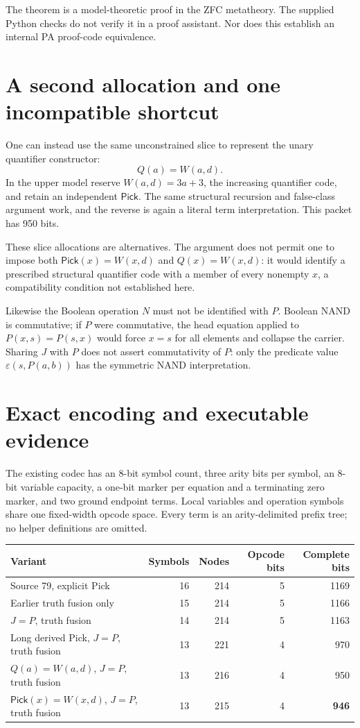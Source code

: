 \documentclass[11pt]{article}
\newcommand{\eps}{\varepsilon}
\begin{document}
The theorem is a model-theoretic proof in the ZFC metatheory. The supplied
Python checks do not verify it in a proof assistant. Nor does this establish
an internal PA proof-code equivalence.

\section{A second allocation and one incompatible shortcut}

One can instead use the same unconstrained slice to represent the unary
quantifier constructor:
\[
                  Q(a)=W(a,d).
\]
In the upper model reserve $W(a,d)=3a+3$, the increasing quantifier code,
and retain an independent $\mathsf{Pick}$. The same structural recursion
and false-class argument work, and the reverse is again a literal term
interpretation. This packet has 950 bits.

These slice allocations are alternatives. The argument does not permit
one to impose both $\mathsf{Pick}(x)=W(x,d)$ and $Q(x)=W(x,d)$: it would
identify a prescribed structural quantifier code with a member of every
nonempty $x$, a compatibility condition not established here.

Likewise the Boolean operation $N$ must not be identified with $P$. Boolean
NAND is commutative; if $P$ were commutative, the head equation applied to
$P(x,s)=P(s,x)$ would force $x=s$ for all elements and collapse the carrier.
Sharing $J$ with $P$ does not assert commutativity of $P$: only the predicate
value $\eps(s,P(a,b))$ has the symmetric NAND interpretation.

\section{Exact encoding and executable evidence}

The existing codec has an 8-bit symbol count, three arity bits per symbol,
an 8-bit variable capacity, a one-bit marker per equation and a terminating
zero marker, and two ground endpoint terms. Local variables and operation
symbols share one fixed-width opcode space. Every term is an arity-delimited
prefix tree; no helper definitions are omitted.

\begin{center}
\begin{tabular}{lrrrr}
\toprule
Variant & Symbols & Nodes & Opcode bits & Complete bits\\
\midrule
Source 79, explicit Pick &16&214&5&1169\\
Earlier truth fusion only &15&214&5&1166\\
$J=P$, truth fusion &14&214&5&1163\\
Long derived Pick, $J=P$, truth fusion &13&221&4&970\\
$Q(a)=W(a,d)$, $J=P$, truth fusion &13&216&4&950\\
$\mathsf{Pick}(x)=W(x,d)$, $J=P$, truth fusion &13&215&4&\textbf{946}\\
\bottomrule
\end{tabular}
\end{center}
\end{document}
